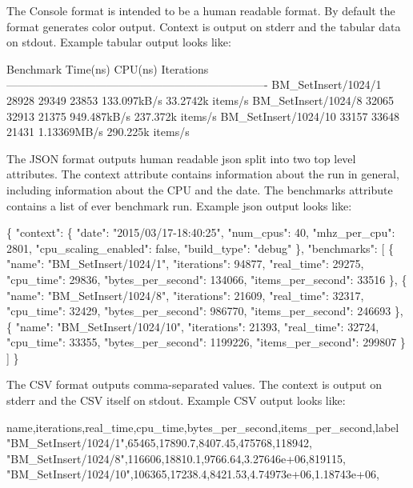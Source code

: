 The Console format is intended to be a human readable format. By default the format generates color output. Context is output on stderr and the tabular data on stdout. Example tabular output looks like\+: 
\begin{DoxyCode}
Benchmark                               Time(ns)    CPU(ns) Iterations
----------------------------------------------------------------------
BM\_SetInsert/1024/1                        28928      29349      23853  133.097kB/s   33.2742k items/s
BM\_SetInsert/1024/8                        32065      32913      21375  949.487kB/s   237.372k items/s
BM\_SetInsert/1024/10                       33157      33648      21431  1.13369MB/s   290.225k items/s
\end{DoxyCode}


The J\+S\+ON format outputs human readable json split into two top level attributes. The {\ttfamily context} attribute contains information about the run in general, including information about the C\+PU and the date. The {\ttfamily benchmarks} attribute contains a list of ever benchmark run. Example json output looks like\+: 
\begin{DoxyCode}
\{
  "context": \{
    "date": "2015/03/17-18:40:25",
    "num\_cpus": 40,
    "mhz\_per\_cpu": 2801,
    "cpu\_scaling\_enabled": false,
    "build\_type": "debug"
  \},
  "benchmarks": [
    \{
      "name": "BM\_SetInsert/1024/1",
      "iterations": 94877,
      "real\_time": 29275,
      "cpu\_time": 29836,
      "bytes\_per\_second": 134066,
      "items\_per\_second": 33516
    \},
    \{
      "name": "BM\_SetInsert/1024/8",
      "iterations": 21609,
      "real\_time": 32317,
      "cpu\_time": 32429,
      "bytes\_per\_second": 986770,
      "items\_per\_second": 246693
    \},
    \{
      "name": "BM\_SetInsert/1024/10",
      "iterations": 21393,
      "real\_time": 32724,
      "cpu\_time": 33355,
      "bytes\_per\_second": 1199226,
      "items\_per\_second": 299807
    \}
  ]
\}
\end{DoxyCode}


The C\+SV format outputs comma-\/separated values. The {\ttfamily context} is output on stderr and the C\+SV itself on stdout. Example C\+SV output looks like\+: 
\begin{DoxyCode}
name,iterations,real\_time,cpu\_time,bytes\_per\_second,items\_per\_second,label
"BM\_SetInsert/1024/1",65465,17890.7,8407.45,475768,118942,
"BM\_SetInsert/1024/8",116606,18810.1,9766.64,3.27646e+06,819115,
"BM\_SetInsert/1024/10",106365,17238.4,8421.53,4.74973e+06,1.18743e+06,
\end{DoxyCode}


